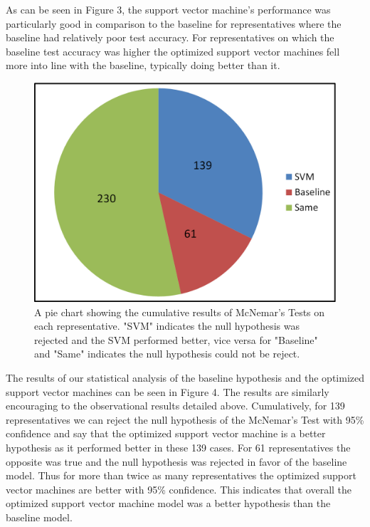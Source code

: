 \documentclass[11pt,letterpaper,twocolumn]{article}
\begin{document}
As can be seen in Figure 3, the support vector machine's performance was particularly good in comparison to the baseline for representatives where the baseline had relatively poor test accuracy. For representatives on which the baseline test accuracy was higher the optimized support vector machines fell more into line with the baseline, typically doing better than it.

\begin{figure}
\includegraphics[width=\columnwidth]{mcnemar_results.png}
\caption{A pie chart showing the cumulative results of McNemar's Tests on each representative. "SVM" indicates the null hypothesis was rejected and the SVM performed better, vice versa for "Baseline" and "Same" indicates the null hypothesis could not be reject.}
\end{figure}

The results of our statistical analysis of the baseline hypothesis and the optimized support vector machines  can be seen in Figure 4. The results are similarly encouraging to the observational results detailed above. Cumulatively, for 139 representatives we can reject the null hypothesis of the McNemar's Test with 95\% confidence and say that the optimized support vector machine is a better hypothesis as it performed better in these 139 cases. For 61 representatives the opposite was true and the null hypothesis was rejected in favor of the baseline model. Thus for more than twice as many representatives the optimized support vector machines are better with 95\% confidence. This indicates that overall the optimized support vector machine model was a better hypothesis than the baseline model.
\end{document}
